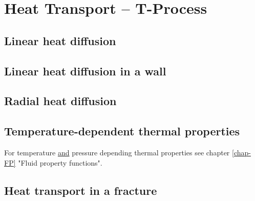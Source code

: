 \chapter{Heat Transport -- T-Process}




\section{Linear heat diffusion}



\section{Linear heat diffusion in a wall}




\section{Radial heat diffusion}




\section{Temperature-dependent thermal properties}

For temperature \underline{and} pressure depending thermal properties see chapter \ref{chap-FP} "Fluid property functions".


\section{Heat transport in a fracture}




